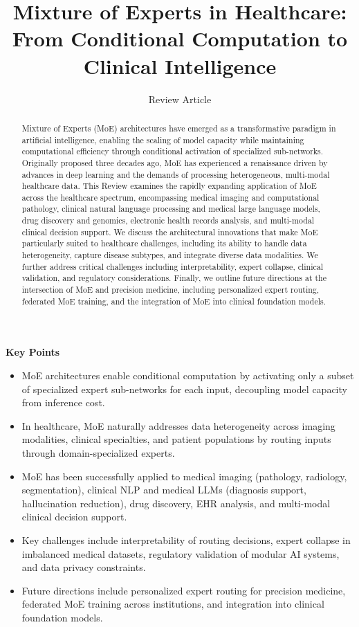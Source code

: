 \documentclass[11pt,a4paper]{article}
\title{
\vspace{-1cm}
\textsf{\textbf{\Large Mixture of Experts in Healthcare:\\[4pt] From Conditional Computation to Clinical Intelligence}}
\vspace{0.3cm}
}
\author{
\textsf{Review Article}
\vspace{0.2cm}
}
\date{}
\newenvironment{keypoints}{%
  \begin{mdframed}[
    backgroundcolor=natureboxbg,
    linecolor=natureboxborder,
    linewidth=1pt,
    roundcorner=5pt,
    innertopmargin=10pt,
    innerbottommargin=10pt,
    innerleftmargin=15pt,
    innerrightmargin=15pt
  ]
  \noindent\textbf{\textsf{Key Points}}\par\medskip
  \begin{itemize}[leftmargin=15pt, itemsep=3pt]
}{%
  \end{itemize}
  \end{mdframed}
}
\begin{document}
\maketitle
\thispagestyle{fancy}

\begin{abstract}
\noindent
Mixture of Experts (MoE) architectures have emerged as a transformative paradigm in artificial intelligence, enabling the scaling of model capacity while maintaining computational efficiency through conditional activation of specialized sub-networks. Originally proposed three decades ago, MoE has experienced a renaissance driven by advances in deep learning and the demands of processing heterogeneous, multi-modal healthcare data. This Review examines the rapidly expanding application of MoE across the healthcare spectrum, encompassing medical imaging and computational pathology, clinical natural language processing and medical large language models, drug discovery and genomics, electronic health records analysis, and multi-modal clinical decision support. We discuss the architectural innovations that make MoE particularly suited to healthcare challenges, including its ability to handle data heterogeneity, capture disease subtypes, and integrate diverse data modalities. We further address critical challenges including interpretability, expert collapse, clinical validation, and regulatory considerations. Finally, we outline future directions at the intersection of MoE and precision medicine, including personalized expert routing, federated MoE training, and the integration of MoE into clinical foundation models.
\end{abstract}

\vspace{0.5cm}

\begin{keypoints}
  \item MoE architectures enable conditional computation by activating only a subset of specialized expert sub-networks for each input, decoupling model capacity from inference cost.
  \item In healthcare, MoE naturally addresses data heterogeneity across imaging modalities, clinical specialties, and patient populations by routing inputs through domain-specialized experts.
  \item MoE has been successfully applied to medical imaging (pathology, radiology, segmentation), clinical NLP and medical LLMs (diagnosis support, hallucination reduction), drug discovery, EHR analysis, and multi-modal clinical decision support.
  \item Key challenges include interpretability of routing decisions, expert collapse in imbalanced medical datasets, regulatory validation of modular AI systems, and data privacy constraints.
  \item Future directions include personalized expert routing for precision medicine, federated MoE training across institutions, and integration into clinical foundation models.
\end{keypoints}
\end{document}

